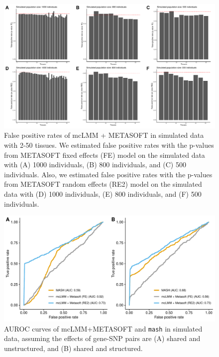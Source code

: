        \begin{figure}
            \centering
            \includegraphics[width=\textwidth]{chapter3/figures/Figure_3.pdf}
            \caption{False positive rates of mcLMM + METASOFT in simulated data with 2-50 tissues. We estimated false positive rates with the p-values from METASOFT fixed effects (FE) model on the simulated data with (A) 1000 individuals, (B) 800 individuals, and (C) 500 individuals. Also, we estimated false positive rates with the p-values from METASOFT random effects (RE2) model on the simulated data with (D) 1000 individuals, (E) 800 individuals, and (F) 500 individuals.}
            \label{fig:fig3.3}
        \end{figure}
        
        \begin{figure}
            \centering
            \includegraphics[width=\textwidth]{chapter3/figures/Figure_4.pdf}
            \caption{AUROC curves of mcLMM+METASOFT and \texttt{mash} in simulated data, assuming the effects of gene-SNP pairs are (A) shared and unstructured, and (B) shared and structured.}
            \label{fig:fig3.4}
        \end{figure}

